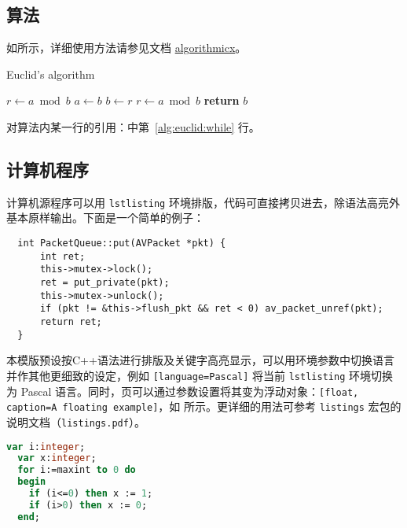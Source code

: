 \subsection{算法}

如所示，详细使用方法请参见文档 \href{https://ctan.org/pkg/algorithmicx?lang=en}{algorithmicx}。

\begin{algorithm}[htbp]
    \small
    \caption{Euclid's algorithm}\label{alg:euclid}
    \begin{algorithmic}[1]
        \State $r\gets a\bmod b$
        \State $a\gets b$
        \State $b\gets r$
        \State $r\gets a\bmod b$
        \EndWhile\label{alg:euclid:while}
        \State \textbf{return} $b$
        \EndProcedure
    \end{algorithmic}
\end{algorithm}

对算法内某一行的引用：中第~\ref{alg:euclid:while} 行。

\subsection{计算机程序}
计算机源程序可以用 \texttt{lstlisting} 环境排版，代码可直接拷贝进去，除语法高亮外基本原样输出。下面是一个简单的例子：
\begin{lstlisting}
  int PacketQueue::put(AVPacket *pkt) {
      int ret;    
      this->mutex->lock();
      ret = put_private(pkt);
      this->mutex->unlock();    
      if (pkt != &this->flush_pkt && ret < 0) av_packet_unref(pkt);    
      return ret;
  }
\end{lstlisting}

本模版预设按C++语法进行排版及关键字高亮显示，可以用环境参数中切换语言并作其他更细致的设定，例如 \texttt{[language=Pascal]} 将当前 \texttt{lstlisting} 环境切换为 Pascal 语言。同时，页可以通过参数设置将其变为浮动对象：\texttt{[float, caption=A floating example]}，如  所示。更详细的用法可参考 \texttt{listings} 宏包的说明文档（\texttt{listings.pdf}）。
\begin{lstlisting}[float, language=Pascal, caption={浮动代码块}, label={lst:samples:pas}]
  var i:integer;
  var x:integer;
  for i:=maxint to 0 do
  begin
    if (i<=0) then x := 1;
    if (i>0) then x := 0;
  end;
\end{lstlisting}

